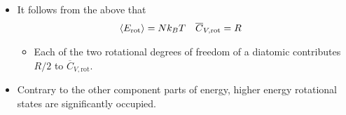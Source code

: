 \documentclass[../notes.tex]{subfiles}
\begin{document}
\begin{itemize}
\begin{itemize}
    \end{itemize}
    \item It follows from the above that
    \begin{align*}
        \left\langle{E_\text{rot}}\right\rangle &= Nk_BT&
        \overline{C}_{V,\text{rot}} &= R
    \end{align*}
    \begin{itemize}
        \item Each of the two rotational degrees of freedom of a diatomic contributes $R/2$ to $\overline{C}_{V,\text{rot}}$.
    \end{itemize}
    \item Contrary to the other component parts of energy, higher energy rotational states are significantly occupied.
    \begin{figure}[h!]
        \centering
\end{figure}
\end{itemize}
\end{document}
